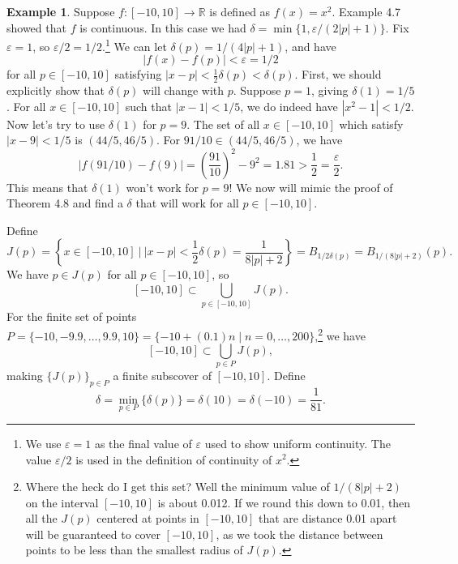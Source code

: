 \documentclass{article}
\newcommand{\R}{\mathbb{R}}
\theoremstyle{definition}
\newtheorem{example}{Example}[section]
\begin{document}
	\begin{example}
		Suppose $ f:[-10,10]\to\R $ is defined as $ f(x)=x^2 $. Example 4.7 showed that $ f $ is continuous. In this case we had $ \delta=\min\{1,\varepsilon/(2|p|+1)\} $. Fix $ \varepsilon=1 $, so $ \varepsilon/2=1/2 $.\footnote{We use $ \varepsilon=1 $ as the final value of $ \varepsilon $ used to show uniform continuity. The value $ \varepsilon/2 $ is used in the definition of continuity of $ x^2 $.} We can let $ \delta(p)=1/(4|p|+1) $, and have $$|f(x)-f(p)|<\varepsilon=1/2 $$ for all $ p\in [-10,10] $ satisfying $ |x-p|<\frac{1}{2}\delta(p)<\delta(p) $. First, we should explicitly show that $ \delta(p) $ will change with $ p $. Suppose $ p=1 $, giving $ \delta(1)=1/5 $. For all $ x\in[-10,10] $ such that $ |x-1|<1/5 $, we do indeed have $ |x^2-1|<1/2 $. Now let's try to use $ \delta(1) $ for $ p=9 $. The set of all $ x\in[-10,10] $ which satisfy $ |x-9|<1/5 $ is $ (44/5,46/5) $. For $ 91/10\in(44/5,46/5) $, we have $$ |f(91/10)-f(9)|=\left(\frac{91}{10}\right)^2-9^2=1.81>\frac{1}{2}=\frac{\varepsilon}{2}.$$ This means that $ \delta(1) $ won't work for $ p=9 $! We now will mimic the proof of Theorem 4.8 and find a $ \delta $ that will work for all $ p\in[-10,10] $. 
		
		Define $$J(p)=\left\{x\in[-10,10]\ \Big|\  |x-p|<\frac{1}{2}\delta(p)=\frac{1}{8|p|+2}\right\}=B_{1/2\delta(p)}=B_{1/(8|p|+2)}(p). $$ We have $ p\in J(p) $ for all $ p\in[-10,10] $, so $$ [-10,10]\subset\bigcup_{p\in [-10,10]}J(p) .$$ For the finite set of points $ P=\{-10,-9.9,\ldots,9.9,10\}=\{-10+(0.1)n\mid n=0,\ldots, 200\} $,\footnote{Where the heck do I get this set? Well the minimum value of $ 1/(8|p|+2) $ on the interval $ [-10,10] $ is about 0.012. If we round this down to 0.01, then all the $ J(p) $ centered at points in $ [-10,10] $ that are distance 0.01 apart will be guaranteed to cover $ [-10,10] $, as we took the distance between points to be less than the smallest radius of $ J(p) $. } we have $$ [-10,10]\subset\bigcup_{p\in P}J(p) ,$$ making $ \{J(p)\}_{p\in P} $ a finite subscover of $ [-10,10] $. Define $$ \delta=\min\limits_{p\in P}\{\delta(p)\}=\delta(10)=\delta(-10)=\frac{1}{81} .$$
		

\end{example}
\end{document}
